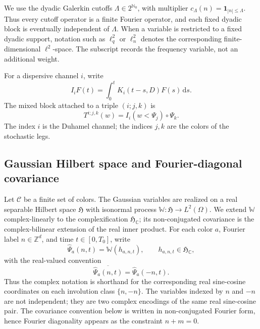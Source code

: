 \documentclass[11pt,reqno]{amsart}
\numberwithin{equation}{section}
\theoremstyle{plain}
\theoremstyle{definition}
\newcommand{\Z}{\mathbb Z}
\newcommand{\N}{\mathbb N}
\newcommand{\cC}{\mathcal C}
\newcommand{\dd}{\,\mathrm d}
\newcommand{\one}{\mathbf 1}
\newcommand{\isoW}{\mathbb W}
\begin{document}
We use the dyadic Galerkin cutoffs \(\Lambda\in2^{\N_0}\), with multiplier \(c_\Lambda(n)=\one_{|n|\le\Lambda}\).  Thus every cutoff operator is a finite Fourier operator, and each fixed dyadic block is eventually independent of \(\Lambda\).  When a variable is restricted to a fixed dyadic support, notation such as \(\ell_q^2\) or \(\ell_n^2\) denotes the corresponding finite-dimensional \(\ell^2\)-space.  The subscript records the frequency variable, not an additional weight.

For a dispersive channel \(i\), write
\begin{equation}\label{eq:duhamel}
        I_iF(t)=\int_0^t K_i(t-s,D)F(s)\dd s.
\end{equation}
The mixed block attached to a triple \((i;j,k)\) is
\begin{equation}\label{eq:block}
        T^{i;j,k}(w)=I_i(w<\Psi_j)\circ\Psi_k .
\end{equation}
The index \(i\) is the Duhamel channel; the indices \(j,k\) are the colors of the stochastic legs.

\subsection{Gaussian Hilbert space and Fourier-diagonal covariance}\label{subsec:gaussian-model}
Let \(\cC\) be a finite set of colors.  The Gaussian variables are realized on a real separable Hilbert space \(\mathfrak H\) with isonormal process \(\isoW:\mathfrak H\to L^2(\Omega)\).  We extend \(\isoW\) complex-linearly to the complexification \(\mathfrak H_{\mathbb C}\); its non-conjugated covariance is the complex-bilinear extension of the real inner product.  For each color \(a\), Fourier label \(n\in\Z^d\), and time \(t\in[0,T_0]\), write
\begin{equation}\label{eq:isonormal-coeff}
        \widehat\Psi_a(n,t)=\isoW(h_{a,n,t}),
        \qquad h_{a,n,t}\in\mathfrak H_\mathbb C,
\end{equation}
with the real-valued convention
\begin{equation}\label{eq:real-convention}
        \overline{\widehat\Psi_a(n,t)}=\widehat\Psi_a(-n,t).
\end{equation}
Thus the complex notation is shorthand for the corresponding real sine-cosine coordinates on each involution class \(\{n,-n\}\).  The variables indexed by \(n\) and \(-n\) are not independent; they are two complex encodings of the same real sine-cosine pair.  The covariance convention below is written in non-conjugated Fourier form, hence Fourier diagonality appears as the constraint \(n+m=0\).
\end{document}
